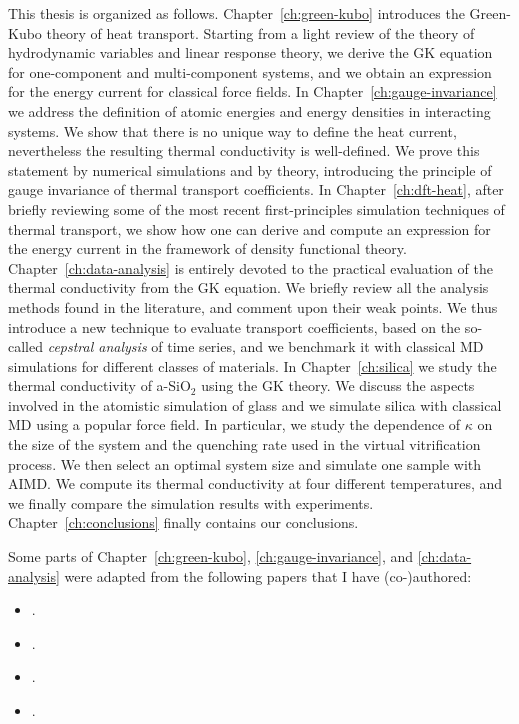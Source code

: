 \medskip
This thesis is organized as follows. 
Chapter~\ref{ch:green-kubo} introduces the Green-Kubo theory of heat transport. 
Starting from a light review of the theory of hydrodynamic variables and linear response theory, we derive the GK equation for one-component and multi-component systems, and we obtain an expression for the energy current for classical force fields. 
In Chapter~\ref{ch:gauge-invariance} we address the definition of atomic energies and energy densities in interacting systems. We show that there is no unique way to define the heat current, nevertheless the resulting thermal conductivity is well-defined. We prove this statement by numerical simulations and by theory, introducing the principle of gauge invariance of thermal transport coefficients. 
In Chapter~\ref{ch:dft-heat}, after briefly reviewing some of the most recent first-principles simulation techniques of thermal transport, we show how one can derive and compute an \abinitio expression for the energy current in the framework of density functional theory. 
Chapter~\ref{ch:data-analysis} is entirely devoted to the practical evaluation of the thermal conductivity from the GK equation. We briefly review all the analysis methods found in the literature, and comment upon their weak points. 
We thus introduce a new technique to evaluate transport coefficients, based on the so-called \emph{cepstral analysis} of time series, and we benchmark it with classical MD simulations for different classes of materials.
In Chapter~\ref{ch:silica} we study the thermal conductivity of a-SiO$_2$ using the \abinitio GK theory. 
We discuss the aspects involved in the atomistic simulation of glass and we simulate silica with classical MD using a popular force field. In particular, we study the dependence of $\kappa$ on the size of the system and the quenching rate used in the virtual vitrification process. 
We then select an optimal system size and simulate one sample with AIMD. 
We compute its thermal conductivity at four different temperatures, and we finally compare the simulation results with experiments. 
Chapter~\ref{ch:conclusions} finally contains our conclusions.

\smallskip
Some parts of Chapter~\ref{ch:green-kubo}, \ref{ch:gauge-invariance}, and \ref{ch:data-analysis} were adapted from the following papers that I have (co-)authored:

\begin{itemize}
    \setlength{\itemsep}{-10pt}
    \item[\textbf{\cite{Ercole2016}}] . \\
    \item[\textbf{\cite{Ercole2017}}] . \\
    \item[\textbf{\cite{Baroni2018}}] . \\
    \item[\textbf{\cite{Bertossa2018}}] . \\
\end{itemize}






